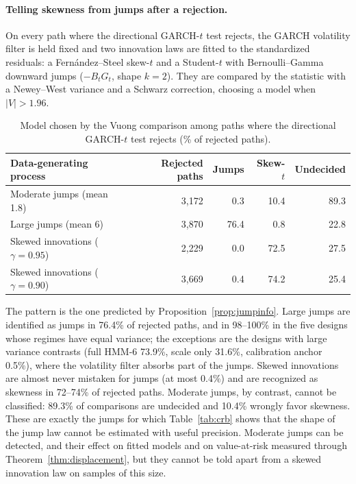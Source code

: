 \documentclass[11pt,a4paper]{article}
\theoremstyle{definition}
\theoremstyle{remark}
\begin{document}
\paragraph{Telling skewness from jumps after a rejection.} On every path where the directional GARCH-$t$ test rejects, the GARCH volatility filter is held fixed and two innovation laws are fitted to the standardized residuals: a Fern\'andez--Steel skew-$t$ and a Student-$t$ with Bernoulli--Gamma downward jumps ($-B_tG_t$, shape $k=2$). They are compared by the \citet{vuong1989} statistic with a Newey--West variance and a Schwarz correction, choosing a model when $|V|>1.96$.

\begin{table}[ht]\centering\footnotesize\setlength{\tabcolsep}{4pt}
\caption{Model chosen by the Vuong comparison among paths where the directional GARCH-$t$ test rejects (\% of rejected paths).}\label{tab:vuong}
\begin{tabular}{lrrrr}
\toprule
Data-generating process & Rejected paths & Jumps & Skew-$t$ & Undecided\\
\midrule
Moderate jumps (mean 1.8) & 3{,}172 & 0.3 & 10.4 & 89.3\\
Large jumps (mean 6) & 3{,}870 & 76.4 & 0.8 & 22.8\\
Skewed innovations ($\gamma=0.95$) & 2{,}229 & 0.0 & 72.5 & 27.5\\
Skewed innovations ($\gamma=0.90$) & 3{,}669 & 0.4 & 74.2 & 25.4\\
\bottomrule
\end{tabular}
\end{table}

The pattern is the one predicted by Proposition~\ref{prop:jumpinfo}. Large jumps are identified as jumps in 76.4\% of rejected paths, and in 98--100\% in the five designs whose regimes have equal variance; the exceptions are the designs with large variance contrasts (full HMM-6 73.9\%, scale only 31.6\%, calibration anchor 0.5\%), where the volatility filter absorbs part of the jumps. Skewed innovations are almost never mistaken for jumps (at most 0.4\%) and are recognized as skewness in 72--74\% of rejected paths. Moderate jumps, by contrast, cannot be classified: 89.3\% of comparisons are undecided and 10.4\% wrongly favor skewness. These are exactly the jumps for which Table~\ref{tab:crb} shows that the shape of the jump law cannot be estimated with useful precision. Moderate jumps can be detected, and their effect on fitted models and on value-at-risk measured through Theorem~\ref{thm:displacement}, but they cannot be told apart from a skewed innovation law on samples of this size.
\end{document}
